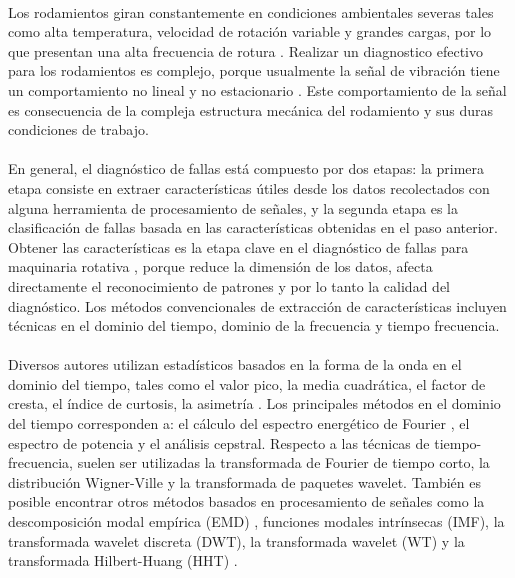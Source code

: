\documentclass[12pt]{article}%
\begin{document}
\paragraph{}
Los rodamientos giran constantemente en condiciones ambientales severas tales como alta temperatura, velocidad de rotación variable y grandes cargas, por lo que presentan una alta frecuencia de rotura \cite{fu}. Realizar un diagnostico efectivo para los rodamientos es complejo, porque usualmente la señal de vibración tiene un comportamiento no lineal y no estacionario \cite{li}. Este comportamiento de la señal es consecuencia de la compleja estructura mecánica del rodamiento y sus duras condiciones de trabajo.

\paragraph{}
En general, el diagnóstico de fallas está compuesto por dos etapas: la primera etapa consiste en extraer características útiles desde los datos recolectados con alguna herramienta de procesamiento de señales, y la segunda etapa es la clasificación de fallas basada en las características obtenidas en el paso anterior. Obtener las características es la etapa clave en el diagnóstico de fallas para maquinaria rotativa \cite{guo}, porque reduce la dimensión de los datos, afecta directamente el reconocimiento de patrones y por lo tanto la calidad del diagnóstico. Los métodos convencionales de extracción de características incluyen técnicas en el dominio del tiempo, dominio de la frecuencia y tiempo frecuencia.
 
\paragraph{}
Diversos autores utilizan estadísticos basados en la forma de la onda en el dominio del tiempo, tales como el valor pico, la media cuadrática, el factor de cresta, el índice de curtosis, la asimetría \cite{zhu}. Los principales métodos en el dominio del tiempo corresponden a: el cálculo del espectro energético de Fourier \cite{jia}, el espectro de potencia \cite{li} y el análisis cepstral. Respecto a las  técnicas de tiempo-frecuencia, suelen ser utilizadas la transformada de Fourier de tiempo corto, la distribución Wigner-Ville y la transformada de paquetes wavelet. También es posible encontrar otros métodos basados en procesamiento de señales como la descomposición modal empírica (EMD) \cite{yu}, funciones modales intrínsecas (IMF), la transformada wavelet discreta (DWT), la transformada wavelet (WT) \cite{chang} y la transformada Hilbert-Huang (HHT) \cite{rai}.
\end{document}
